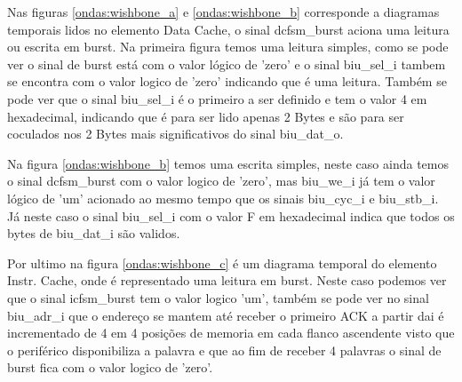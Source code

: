 Nas figuras \ref{ondas:wishbone_a} e \ref{ondas:wishbone_b} corresponde a diagramas temporais lidos no elemento Data Cache, o sinal dcfsm\_burst aciona uma leitura ou escrita em burst. Na primeira figura temos uma leitura simples, como se pode ver o sinal de burst está com o valor lógico de 'zero' e o sinal biu\_sel\_i tambem se encontra com o valor logico de  'zero' indicando que é uma leitura. Também se pode ver que o sinal biu\_sel\_i é o primeiro a ser definido e tem o valor 4 em hexadecimal, indicando que é para ser lido apenas 2 Bytes e são para ser coculados nos 2 Bytes mais significativos do sinal biu\_dat\_o.

Na figura \ref{ondas:wishbone_b} temos uma escrita simples, neste caso ainda temos o sinal dcfsm\_burst com o valor logico de 'zero', mas biu\_we\_i já tem o valor lógico de 'um' acionado ao mesmo tempo que os sinais biu\_cyc\_i e biu\_stb\_i. Já neste caso o sinal biu\_sel\_i com o valor F em hexadecimal indica que todos os bytes de biu\_dat\_i são validos.

Por ultimo na figura \ref{ondas:wishbone_c} é um diagrama temporal do elemento Instr. Cache, onde é representado uma leitura em burst. Neste caso podemos ver que o sinal icfsm\_burst tem o valor logico 'um', também se pode ver no sinal biu\_adr\_i que o endereço se mantem até receber o primeiro ACK a partir dai é incrementado de 4 em 4 posições de memoria em cada flanco ascendente visto que o periférico disponibiliza a palavra e que ao fim de receber 4 palavras o sinal de burst fica com o valor logico de 'zero'.

